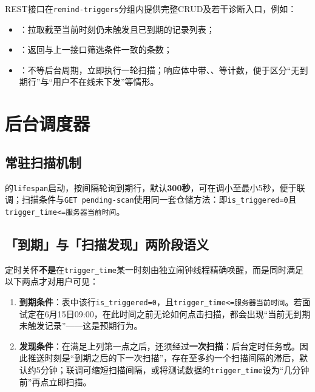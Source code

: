 \documentclass{base}
\newcommand{\id}[1]{\path{#1}}
\begin{document}
REST接口在\texttt{remind-triggers}分组内提供完整CRUD及若干诊断入口，例如：
\begin{itemize}\setlength{\itemsep}{2pt}\setlength{\parsep}{0pt}
    \item {}：拉取截至当前时刻仍未触发且已到期的记录列表；
    \item {}：返回与上一接口筛选条件一致的条数；
    \item {}：不等后台周期，立即执行一轮扫描；响应体中带、、等计数，便于区分``无到期行''与``用户不在线未下发''等情形。
\end{itemize}

\section{后台调度器}

\subsection{常驻扫描机制}

的\texttt{lifespan}启动，按间隔轮询到期行，默认\textbf{300秒}，可在调小至最小5秒，便于联调；扫描条件与\texttt{GET pending-scan}使用同一套仓储方法\id{list_pending_before}：即\texttt{is\_triggered=0}且\texttt{trigger\_time<=服务器当前时间}。

\subsection{「到期」与「扫描发现」两阶段语义}\label{sec:two_phase}

定时关怀\textbf{不是}在\texttt{trigger\_time}某一时刻由独立闹钟线程精确唤醒，而是同时满足以下两点才对用户可见：

\begin{enumerate}
    \item \textbf{到期条件}：表中该行\texttt{is\_triggered=0}，且\texttt{trigger\_time<=服务器当前时间}。若面试定在6月15日09:00，在此时间之前无论如何点击扫描，都会出现``当前无到期未触发记录''——这是预期行为。
    \item \textbf{发现条件}：在满足上列第一点之后，还须经过\textbf{一次扫描}：后台定时任务或。因此推送时刻是``到期之后的下一次扫描''，存在至多约一个扫描间隔的滞后，默认约5分钟；联调可缩短扫描间隔，或将测试数据的\texttt{trigger\_time}设为``几分钟前''再点立即扫描。
\end{enumerate}
\end{document}
